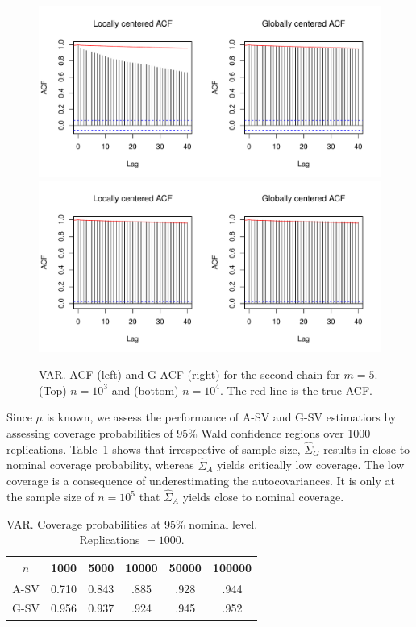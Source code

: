 \documentclass[12pt]{article}
\theoremstyle{remark}
\begin{document}
\begin{figure}[htbp]
\centering
   \includegraphics[width=.60\linewidth]{plots/var-acf_n1000.pdf}
     \includegraphics[width=.60\linewidth]{plots/var-acf_n10000.pdf} 
\caption{VAR. ACF (left) and G-ACF (right) for the second chain for $m = 5$. (Top) $n = 10^3$  and (bottom) $n =  10^4$. The red line is the true ACF.}
\label{fig:var-acf}
\end{figure}

Since $\mu$ is known, we assess the performance of A-SV and G-SV estimatiors by assessing coverage probabilities of $95\%$ Wald confidence regions over 1000 replications.  Table~\ref{tab:var-coverage} shows that irrespective of sample size, $\hat{\Sigma}_G$ results in close to nominal coverage probability, whereas $\hat{\Sigma}_A$ yields critically low coverage. The low coverage is a consequence of underestimating the autocovariances. It is only at the sample size of $n=10^5$ that $\hat{\Sigma}_A$ yields close to nominal coverage. 


\begin{table}[htbp]
    \centering
    \small
    \begin{tabular}{|c|ccccc|}
    \hline
$n$  &  1000  & 5000  & 10000  & 50000  & 100000 \\  \hline
A-SV  &    0.710 & 0.843 & .885 & .928 & .944 \\ 
G-SV  &    0.956 & 0.937 & .924 & .945 & .952 \\ \hline
    \end{tabular}
    \caption{VAR. Coverage probabilities at $95 \%$ nominal level. Replications $= 1000$.}
    \label{tab:var-coverage}
\end{table}
\end{document}
